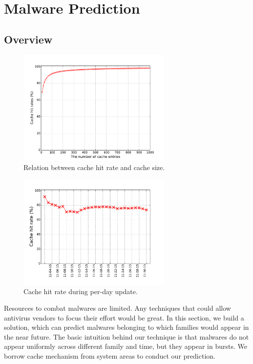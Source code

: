 \section{Malware Prediction}
\label{sec:predict}

\subsection{Overview}

\begin{figure}[t!]
\begin{center}
\includegraphics[width=3.0in]{figure/LRU}
\caption{Relation between cache hit rate and cache size.}
\label{fig:cache}
\end{center}
\end{figure}


\begin{figure}[t!]
\begin{center}
\includegraphics[width=3.0in]{figure/LRU_day}
\caption{Cache hit rate during per-day update.}
\label{fig:batchcache}
\end{center}
\end{figure}

Resources to combat malwares are limited. 
Any techniques that could allow antivirus vendors to focus their effort would be great. 
In this section, we build a solution, which can predict malwares belonging to which families would appear in the near future. 
The basic intuition behind our technique is that malwares do not appear uniformly across different family and time, but they appear in bursts.
We borrow cache mechanism from system areas to conduct our prediction. 

